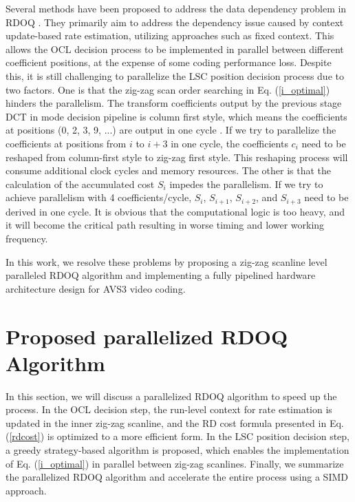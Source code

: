 \documentclass[lettersize,journal]{IEEEtran}
\begin{document}
Several methods have been proposed to address the data dependency problem in RDOQ \cite{igarashi2018parallelGPU,xu2022hardwarefriendlyforrdoq,zhao2023scanline}. They primarily aim to address the dependency issue caused by context update-based rate estimation, utilizing approaches such as fixed context. This allows the OCL decision process to be implemented in parallel between different coefficient positions, at the expense of some coding performance loss. Despite this, it is still challenging to parallelize the LSC position decision process due to two factors. One is that the zig-zag scan order searching in Eq. (\ref{i_optimal}) hinders the parallelism. The transform coefficients output by the previous stage DCT in mode decision pipeline is column first style, which means the coefficients at positions (0, 2, 3, 9, ...) are output in one cycle \cite{fan2019pipelined}. If we try to parallelize the coefficients at positions from $i$ to $i+3$ in one cycle, the coefficients $c_i$ need to be reshaped from column-first style to zig-zag first style. This reshaping process will consume additional clock cycles and memory resources. The other is that the calculation of the accumulated cost $S_{i}$ impedes the parallelism. If we try to achieve parallelism with 4 coefficients/cycle, $S_{i}$, $S_{i+1}$, $S_{i+2}$, and $S_{i+3}$ need to be derived in one cycle. It is obvious that the computational logic is too heavy, and it will become the critical path resulting in worse timing and lower working frequency. 

In this work, we resolve these problems by proposing a zig-zag scanline level paralleled RDOQ algorithm and implementing a fully pipelined hardware architecture design for AVS3 video coding. 

\section{Proposed parallelized RDOQ Algorithm}
\label{sec:3}
In this section, we will discuss a parallelized RDOQ algorithm to speed up the process. In the OCL decision step, the run-level context for rate estimation is updated in the inner zig-zag scanline, and the RD cost formula presented in Eq. (\ref{rdcost}) is optimized to a more efficient form. In the LSC position decision step, a greedy strategy-based algorithm is proposed, which enables the implementation of Eq. (\ref{i_optimal}) in parallel between zig-zag scanlines. Finally, we summarize the parallelized RDOQ algorithm and accelerate the entire process using a SIMD approach. 
\end{document}
